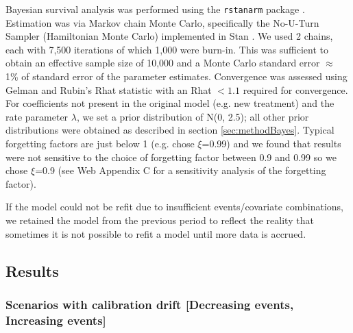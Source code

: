 \documentclass[]{article}
\begin{document}
Bayesian survival analysis was performed using the \texttt{rstanarm} package \citep{Brilleman2020}. Estimation was via Markov chain Monte Carlo, specifically the No-U-Turn Sampler (Hamiltonian Monte Carlo) implemented in Stan \citep{Hoffman2014}. We used 2 chains, each with 7,500 iterations of which 1,000 were burn-in. This was sufficient to obtain an effective sample size of 10,000 and a Monte Carlo standard error $\approx$  1\% of standard error of the parameter estimates. Convergence was assessed using Gelman and Rubin's Rhat statistic \citep{Gelman1992} with an Rhat $<1.1$ required for convergence. For coefficients not present in the original model (e.g. new treatment) and the rate parameter $\lambda$, we set a prior distribution of N(0, 2.5); all other prior distributions were obtained as described in section \ref{sec:methodBayes}. Typical forgetting factors are just below 1 (e.g. \citet{Raftery2010} chose $\xi$=0.99) and we found that results were not sensitive to the choice of forgetting factor between 0.9 and 0.99 so we chose $\xi$=0.9 (see Web Appendix C for a sensitivity analysis of the forgetting factor).    

If the model could not be refit due to insufficient events/covariate combinations, we retained the model from the previous period to reflect the reality that sometimes it is not possible to refit a model until more data is accrued.



\subsection{Results}
\label{sec:SSResults}

\subsubsection{Scenarios with calibration drift [Decreasing events, Increasing events]}
\end{document}
